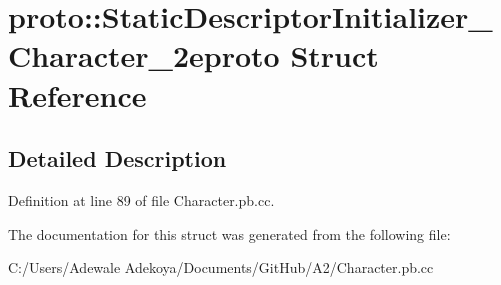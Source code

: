 \hypertarget{structproto_1_1_static_descriptor_initializer___character__2eproto}{}\section{proto\+:\+:Static\+Descriptor\+Initializer\+\_\+\+Character\+\_\+2eproto Struct Reference}
\label{structproto_1_1_static_descriptor_initializer___character__2eproto}


\subsection{Detailed Description}


Definition at line 89 of file Character.\+pb.\+cc.



The documentation for this struct was generated from the following file\+:\begin{DoxyCompactItemize}
\item 
C\+:/\+Users/\+Adewale Adekoya/\+Documents/\+Git\+Hub/\+A2/Character.\+pb.\+cc\end{DoxyCompactItemize}

